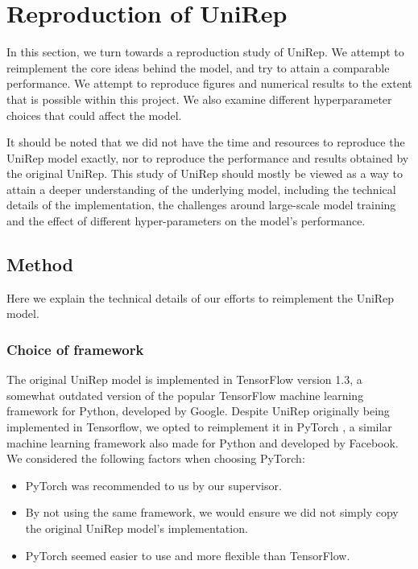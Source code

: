 \documentclass[a4paper,12pt]{article}
\begin{document}



\clearpage
\section{Reproduction of UniRep}
In this section, we turn towards a reproduction study of UniRep. We attempt to reimplement the core ideas behind the model, and try to attain a comparable performance. We attempt to reproduce figures and numerical results to the extent that is possible within this project. We also examine different hyperparameter choices that could affect the model.

It should be noted that we did not have the time and resources to reproduce the UniRep model exactly, nor to reproduce the performance and results obtained by the original UniRep. This study of UniRep should mostly be viewed as a way to attain a deeper understanding of the underlying model, including the technical details of the implementation, the challenges around large-scale model training and the effect of different hyper-parameters on the model's performance.

\subsection{Method}
Here we explain the technical details of our efforts to reimplement the UniRep model.

\subsubsection{Choice of framework}
The original UniRep model is implemented in TensorFlow version 1.3, a somewhat outdated version of the popular TensorFlow machine learning framework for Python, developed by Google. Despite UniRep originally being implemented in Tensorflow, we opted to reimplement it in PyTorch \cite{NEURIPS2019_9015}, a similar machine learning framework also made for Python and developed by Facebook. We considered the following factors when choosing PyTorch:
\begin{itemize}
    \item PyTorch was recommended to us by our supervisor.
    \item By not using the same framework, we would ensure we did not simply copy the original UniRep model's implementation.
    \item PyTorch seemed easier to use and more flexible than TensorFlow.
\end{itemize}
\end{document}
